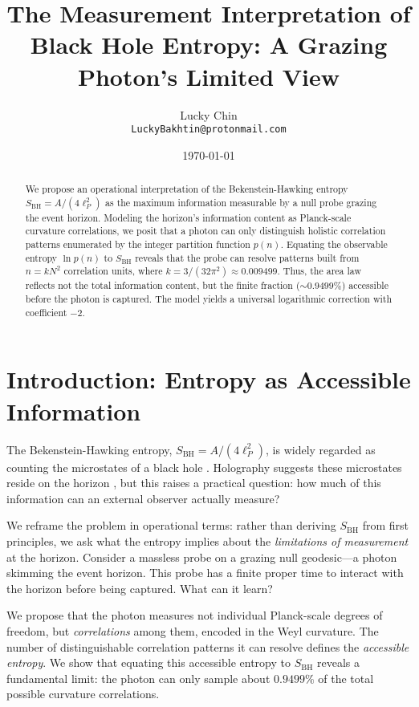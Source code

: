 \documentclass[12pt, letterpaper]{article}
\title{The Measurement Interpretation of Black Hole Entropy: A Grazing Photon's Limited View}
\author{Lucky Chin \\ \normalsize \texttt{LuckyBakhtin@protonmail.com}}
\date{\today}
\begin{document}
\maketitle

\begin{abstract}
We propose an operational interpretation of the Bekenstein-Hawking entropy $S_{\mathrm{BH}} = A/(4\ell_P^2)$ as the maximum information measurable by a null probe grazing the event horizon. Modeling the horizon's information content as Planck-scale curvature correlations, we posit that a photon can only distinguish holistic correlation patterns enumerated by the integer partition function $p(n)$. Equating the observable entropy $\ln p(n)$ to $S_{\mathrm{BH}}$ reveals that the probe can resolve patterns built from $n = k N^2$ correlation units, where $k = 3/(32\pi^2) \approx 0.009499$. Thus, the area law reflects not the total information content, but the finite fraction ($\sim 0.9499\%$) accessible before the photon is captured. The model yields a universal logarithmic correction with coefficient $-2$.
\end{abstract}

\section{Introduction: Entropy as Accessible Information}

The Bekenstein-Hawking entropy, $S_{\mathrm{BH}} = A/(4\ell_P^2)$, is widely regarded as counting the microstates of a black hole \cite{bekenstein1973, hawking1975}. Holography suggests these microstates reside on the horizon \cite{thooft1993, susskind1995}, but this raises a practical question: how much of this information can an external observer actually measure?

We reframe the problem in operational terms: rather than deriving $S_{\mathrm{BH}}$ from first principles, we ask what the entropy implies about the \emph{limitations of measurement} at the horizon. Consider a massless probe on a grazing null geodesic—a photon skimming the event horizon. This probe has a finite proper time to interact with the horizon before being captured. What can it learn?

We propose that the photon measures not individual Planck-scale degrees of freedom, but \emph{correlations} among them, encoded in the Weyl curvature. The number of distinguishable correlation patterns it can resolve defines the \emph{accessible entropy}. We show that equating this accessible entropy to $S_{\mathrm{BH}}$ reveals a fundamental limit: the photon can only sample about $0.9499\%$ of the total possible curvature correlations.
\end{document}
